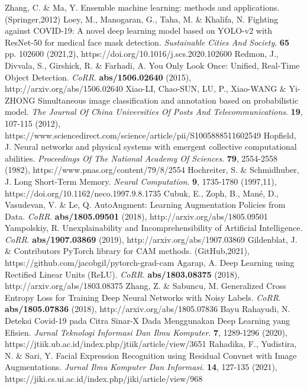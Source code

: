 \documentclass{article}
\begin{document}
\begin{thebibliography}{1}
	Zhang, C. \& Ma, Y. Ensemble machine learning: methods and applications. (Springer,2012)
	Loey, M., Manogaran, G., Taha, M. \& Khalifa, N. Fighting against COVID-19: A novel deep learning model based on YOLO-v2 with ResNet-50 for medical face mask detection. {\em Sustainable Cities And Society}. \textbf{65} pp. 102600 (2021,2), https://doi.org/10.1016/j.scs.2020.102600
	Redmon, J., Divvala, S., Girshick, R. \& Farhadi, A. You Only Look Once: Unified, Real-Time Object Detection. {\em CoRR}. \textbf{abs/1506.02640} (2015), http://arxiv.org/abs/1506.02640
	Xiao-LI, Chao-SUN, LU, P., Xiao-WANG \& Yi-ZHONG Simultaneous image classification and annotation based on probabilistic model. {\em The Journal Of China Universities Of Posts And Telecommunications}. \textbf{19}, 107-115 (2012), https://www.sciencedirect.com/science/article/pii/S1005888511602549
	Hopfield, J. Neural networks and physical systems with emergent collective computational abilities. {\em Proceedings Of The National Academy Of Sciences}. \textbf{79}, 2554-2558 (1982), https://www.pnas.org/content/79/8/2554
	Hochreiter, S. \& Schmidhuber, J. Long Short-Term Memory. {\em Neural Computation}. \textbf{9}, 1735-1780 (1997,11), https://doi.org/10.1162/neco.1997.9.8.1735
	Cubuk, E., Zoph, B., Mané, D., Vasudevan, V. \& Le, Q. AutoAugment: Learning Augmentation Policies from Data. {\em CoRR}. \textbf{abs/1805.09501} (2018), http://arxiv.org/abs/1805.09501
	Yampolskiy, R. Unexplainability and Incomprehensibility of Artificial Intelligence. {\em CoRR}. \textbf{abs/1907.03869} (2019), http://arxiv.org/abs/1907.03869
	Gildenblat, J. \& Contributors PyTorch library for CAM methods. (GitHub,2021), https://github.com/jacobgil/pytorch-grad-cam
	Agarap, A. Deep Learning using Rectified Linear Units (ReLU). {\em CoRR}. \textbf{abs/1803.08375} (2018), http://arxiv.org/abs/1803.08375
	Zhang, Z. \& Sabuncu, M. Generalized Cross Entropy Loss for Training Deep Neural Networks with Noisy Labels. {\em CoRR}. \textbf{abs/1805.07836} (2018), http://arxiv.org/abs/1805.07836
	Bayu Rahayudi, N. Deteksi Covid-19 pada Citra Sinar-X Dada Menggunakan Deep Learning yang Efisien. {\em Jurnal Teknologi Informasi Dan Ilmu Komputer}. \textbf{7}, 1289-1296 (2020), https://jtiik.ub.ac.id/index.php/jtiik/article/view/3651
	Rahadika, F., Yudistira, N. \& Sari, Y. Facial Expression Recognition using Residual Convnet with Image Augmentations. {\em Jurnal Ilmu Komputer Dan Informasi}. \textbf{14}, 127-135 (2021), https://jiki.cs.ui.ac.id/index.php/jiki/article/view/968


\end{thebibliography}
\end{document}
